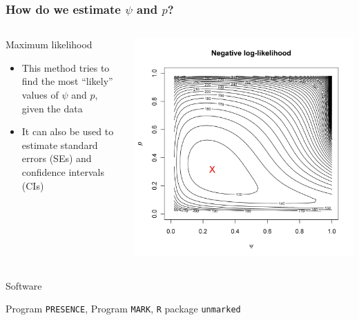 \documentclass[color=usenames,dvipsnames]{beamer}\usepackage[]{graphicx}\usepackage[]{xcolor}
\begin{document}
\begin{frame}
  \frametitle{How do we estimate $\psi$ and $p$?}
  \pause
  \begin{columns}
    \begin{column}{0.6\textwidth}
      \large {%
        Maximum likelihood \par}
      \large
      \begin{itemize}%
      \item This method tries to find the most ``likely'' values of
        $\psi$ and $p$, given the data
      \item It can also be used to estimate standard errors (SEs) and
        confidence intervals (CIs)
      \end{itemize}
    \end{column}
    \pause
    \begin{column}{0.4\textwidth}
      \includegraphics[width=\textwidth]{figs/mlePandPsi}
    \end{column}
  \end{columns}
  \pause
  {%
    Software \par}
  Program {\tt PRESENCE}, Program {\tt MARK}, {\tt R} package {\tt unmarked}
\end{frame}
\end{document}
